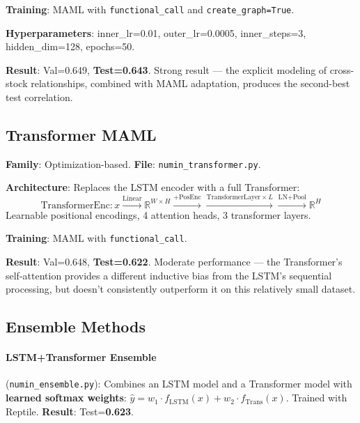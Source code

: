 \documentclass[11pt,a4paper]{article}
\begin{document}
\textbf{Training}: MAML with \texttt{functional\_call} and \texttt{create\_graph=True}.

\textbf{Hyperparameters}: inner\_lr=0.01, outer\_lr=0.0005, inner\_steps=3, hidden\_dim=128, epochs=50.

\textbf{Result}: Val=0.649, \textbf{Test=0.643}. Strong result --- the explicit modeling of cross-stock relationships, combined with MAML adaptation, produces the second-best test correlation.

\subsection{Transformer MAML}

\textbf{Family}: Optimization-based. \textbf{File}: \texttt{numin\_transformer.py}.

\textbf{Architecture}: Replaces the LSTM encoder with a full Transformer:
\begin{equation}
  \text{TransformerEnc}: x \xrightarrow{\text{Linear}} \mathbb{R}^{W \times H} \xrightarrow{+\text{PosEnc}} \xrightarrow{\text{TransformerLayer} \times L} \xrightarrow{\text{LN+Pool}} \mathbb{R}^{H}
\end{equation}
Learnable positional encodings, 4 attention heads, 3 transformer layers.

\textbf{Training}: MAML with \texttt{functional\_call}.

\textbf{Result}: Val=0.648, \textbf{Test=0.622}. Moderate performance --- the Transformer's self-attention provides a different inductive bias from the LSTM's sequential processing, but doesn't consistently outperform it on this relatively small dataset.

\subsection{Ensemble Methods}

\paragraph{LSTM+Transformer Ensemble} (\texttt{numin\_ensemble.py}): Combines an LSTM model and a Transformer model with \textbf{learned softmax weights}: $\hat{y} = w_1 \cdot f_{\text{LSTM}}(x) + w_2 \cdot f_{\text{Trans}}(x)$. Trained with Reptile. \textbf{Result}: Test=\textbf{0.623}.
\end{document}
